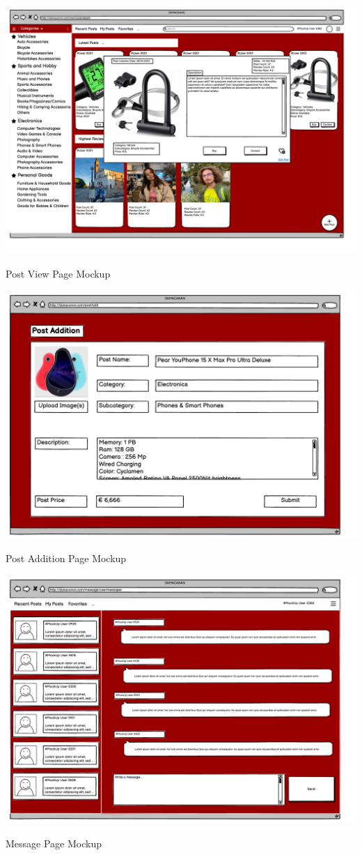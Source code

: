 \begin{center}
\includegraphics[scale = 0.7, center]{Mockup/Post_View_Mockup.pdf}
\caption{Post View Page Mockup}
\label{fig:my_label}



\includegraphics[scale = 0.7, center]{Mockup/Post_Add_Mockup.pdf}
\caption{Post Addition Page Mockup}
\label{fig:my_label}




\includegraphics[scale = 0.7, center]{Mockup/Message_Page_Mockup.pdf}
\caption{Message Page Mockup}
\label{fig:my_label}





\end{center}
